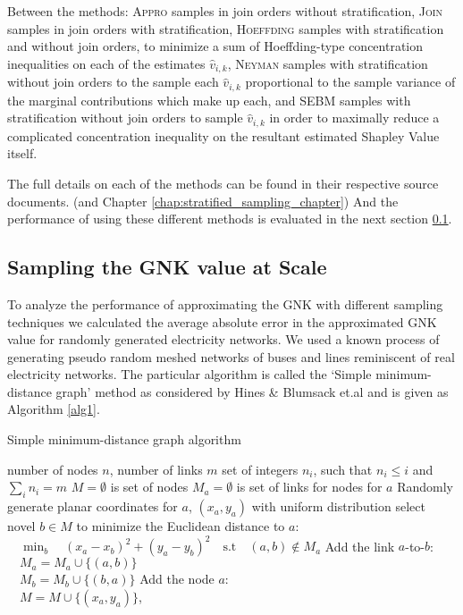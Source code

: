 Between the methods: \textsc{Appro} samples in join orders without stratification, \textsc{Join} samples in join orders with stratification, \textsc{Hoeffding} samples with stratification and without join orders, to minimize a sum of Hoeffding-type concentration inequalities on each of the estimates $\hat{v}_{i,k}$,
\textsc{Neyman} samples with stratification without join orders to the sample each $\hat{v}_{i,k}$ proportional to the sample variance of the marginal contributions which make up each,
and \textsc{SEBM} samples with stratification without join orders to sample $\hat{v}_{i,k}$ in order to maximally reduce a complicated concentration inequality on the resultant estimated Shapley Value itself.

The full details on each of the methods can be found in their respective source documents.\cite{CASTRO2017180,2013arXiv1306.4265M,DBLP:journals/cor/CastroGT09} (and Chapter \ref{chap:stratified_sampling_chapter})
And the performance of using these different methods is evaluated in the next section \ref{section:performance}.

\subsection{Sampling the GNK value at Scale}\label{section:performance}

To analyze the performance of approximating the GNK with different sampling techniques we calculated the average absolute error in the approximated GNK value for randomly generated electricity networks.
We used a known process of generating pseudo random meshed networks of buses and lines reminiscent of real electricity networks. The particular algorithm is called the `Simple minimum-distance graph' method as considered by Hines \& Blumsack et.al \cite{hines1} and is given as Algorithm \ref{alg1}.

\begin{algorithm}[]
\caption{Simple minimum-distance graph algorithm}
\label{alg1}
\begin{algorithmic}
    \REQUIRE number of nodes $n$, number of links $m$
    \REQUIRE set of integers $n_i$, such that $n_i\leq i$ and $\sum_in_i=m$
    \STATE $M=\emptyset$ is set of nodes
    \STATE $M_a=\emptyset$ is set of links for nodes for $a$
        \STATE Randomly generate planar coordinates for $a$, $(x_a ,y_a)$ with uniform distribution
            \STATE select novel $b\in M$ to minimize the Euclidean distance to $a$:\\ $\quad\min_b\quad (x_a-x_b)^2+(y_a-y_b)^2\quad\text{s.t}\quad (a, b)\notin M_a$
            \STATE Add the link $a$-to-$b$:\\ $\quad M_a=M_a\cup \{(a, b)\}$\\ $\quad M_b=M_b\cup \{(b, a)\}$
        \ENDFOR
        \STATE Add the node $a$:\\ $\quad M=M\cup \{(x_a ,y_a)\}$, 
    \ENDFOR
\end{algorithmic}
\end{algorithm}

